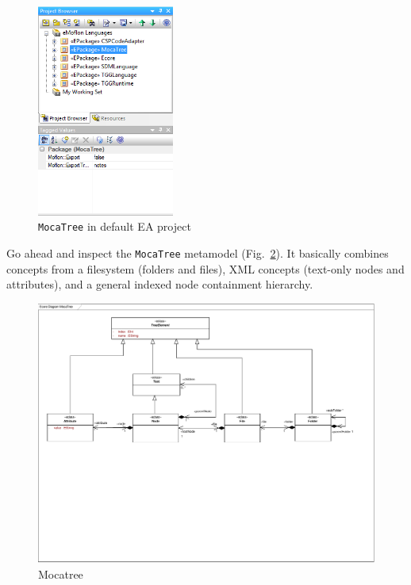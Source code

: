 \begin{enumerate}
\begin{figure}[!htbp]
\begin{center}
 \includegraphics[width=0.4\textwidth]{pics/moca/1DictionaryMetaModel/4-eapContainsMocatreeWithExportFalse}
  \caption{\texttt{MocaTree} in default EA project}
  \label{fig:moca-4-eapContainsMocatreeWithExportFalse}
\end{center}
\end{figure}
\end{enumerate}

\clearpage

Go ahead and inspect the \texttt{MocaTree} metamodel (Fig.~\ref{fig:moca-tree}).
It basically combines concepts from a filesystem (folders and files), XML concepts (text-only nodes and attributes), and a general indexed node containment hierarchy.

\begin{figure}[!htbp]
\begin{center}
 \includegraphics[width=\textwidth]{pics/moca/0Install/0-MocaTree}
  \caption{Mocatree}
  \label{fig:moca-tree}
\end{center}
\end{figure}
 
